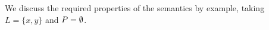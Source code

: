 
We discuss the required properties of the semantics by example, taking
$L=\{x,y\}$ and $P=\emptyset$.

